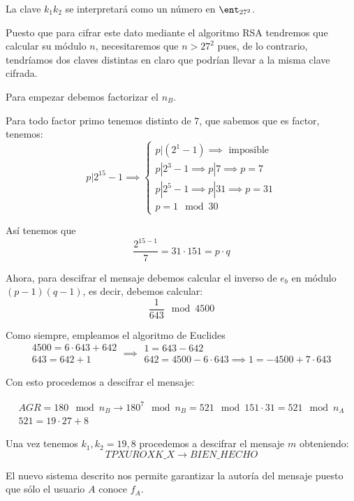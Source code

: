 \begin{problem}[5]

\spart

La clave $k_1k_2$ se interpretará como un número en $\ent_{27^2}$.

Puesto que para cifrar este dato mediante el algoritmo RSA tendremos que calcular su módulo $n$, necesitaremos que $n>27^2$ pues, de lo contrario, tendríamos dos claves distintas en claro que podrían llevar a la misma clave cifrada.

\spart

Para empezar debemos factorizar el $n_B$.

Para todo factor primo tenemos distinto de $7$, que sabemos que es factor, tenemos:
\[p|2^{15}-1 \implies \left\{ \begin{array}{l}
p|(2^1-1)\implies \text{ imposible}\\
p|2^3-1 \implies p|7 \implies p=7\\
p|2^5-1 \implies p |31 \implies  p=31\\
p =1 \mod 30 \end{array}\right.\]

Así tenemos que
\[\frac{2^{15-1}}{7} = 31\cdot 151 = p\cdot q\]

Ahora, para descifrar el mensaje debemos calcular el inverso de $e_b$ en módulo $(p-1)(q-1)$, es decir, debemos calcular:
\[\frac{1}{643} \mod 4500\]

Como siempre, empleamos el algoritmo de Euclides
\[
\begin{array}{l}
4500 = 6 \cdot 643 + 642\\
643 = 642 + 1
\end{array} \implies \begin{array}{l}
1 = 643 - 642 \\
642 = 4500 - 6 \cdot 643 \implies 1 = -4500 + 7\cdot 643
\end{array}
\]

Con esto procedemos a descifrar el mensaje:

\[\begin{array}{l}
AGR = 180 \mod n_B \to 180^{7} \mod n_B = 521 \mod 151\cdot 31 = 521 \mod n_A \\
521 = 19 \cdot 27 + 8
\end{array}\]

Una vez tenemos $k_1,k_2=19,8$ procedemos a descifrar el mensaje $m$ obteniendo:
\[TPXUROXK\_X \to BIEN\_HECHO\]
\newpage

\spart

El nuevo sistema descrito nos permite garantizar la autoría del mensaje puesto que sólo el usuario $A$ conoce $f_A$.


\end{problem}
